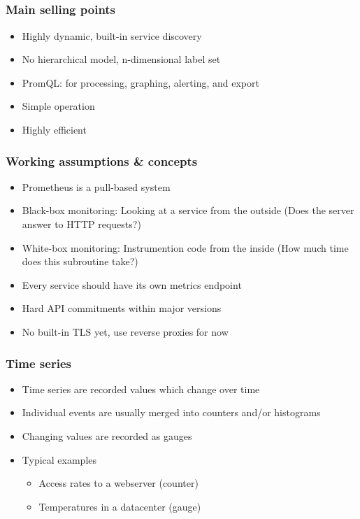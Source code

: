 \documentclass[aspectratio=169]{beamer}
\begin{document}
\subsection{}


\begin{frame}
	\frametitle{Main selling points}
	\begin{itemize}
		\item Highly dynamic, built-in service discovery
		\item No hierarchical model, n-dimensional label set
		\item PromQL: for processing, graphing, alerting, and export
		\item Simple operation
		\item Highly efficient
	\end{itemize}
\end{frame}

\begin{frame}
	\frametitle{Working assumptions \& concepts}
	\begin{itemize}
		\item Prometheus is a pull-based system
		\item Black-box monitoring: Looking at a service from the outside (Does the server answer to HTTP requests?)
		\item White-box monitoring: Instrumention code from the inside (How much time does this subroutine take?)
		\item Every service should have its own metrics endpoint
		\item Hard API commitments within major versions
		\item No built-in TLS yet, use reverse proxies for now
	\end{itemize}
\end{frame}

\begin{frame}
	\frametitle{Time series}
	\begin{itemize}
		\item Time series are recorded values which change over time
		\item Individual events are usually merged into counters and/or histograms
		\item Changing values are recorded as gauges
		\item Typical examples
		\begin{itemize}
			\item Access rates to a webserver (counter)
			\item Temperatures in a datacenter (gauge)
		\end{itemize}
	\end{itemize}
\end{frame}
\end{document}
